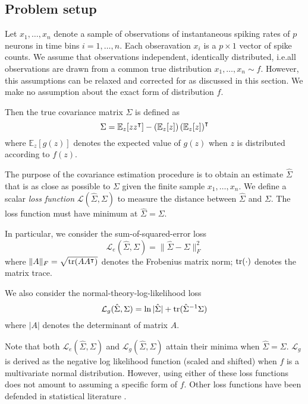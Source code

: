 \subsection{Problem setup}
Let $x_1,\ldots,x_n$ denote a sample of observations of instantaneous spiking rates of $p$ neurons in time bins $i=1,\ldots,n$.  Each obseravation $x_i$ is a $p\times 1$ vector of spike counts.  We assume that observations independent, identically distributed, i.e.\;all observations are drawn from a common true distribution $x_1,\ldots,x_n \sim f$.  However, this assumptions can be relaxed and corrected for as discussed in this section. We make no assumption about the exact form of distribution $f$. 

Then the true  covariance matrix $\Sigma$ is defined as
\begin{equation}
\Sigma =\mathbb E_z[ zz^\intercal] - \left(\mathbb E_z[z]\right)\left(\mathbb E_z[z]\right)^\intercal
\end{equation}
where $\mathbb E_z[g(z)]$ denotes the expected value of $g(z)$ when $z$ is distributed according to $f(z)$. 

The purpose of the covariance estimation procedure is to obtain an estimate $\hat \Sigma$ that is as close as possible to $\Sigma$ given the finite sample  $x_1,\ldots,x_n$. We define a scalar \emph{loss function} $\mathcal L\left(\hat \Sigma, \Sigma\right)$ to measure the distance between $\hat \Sigma$ and $\Sigma$.  The loss function must have minimum at $\hat \Sigma=\Sigma$. 

In particular, we consider the sum-of-squared-error loss
\begin{equation}
\mathcal L_e(\hat \Sigma, \Sigma) =  \| \hat \Sigma - \Sigma\|^2_F 
\end{equation}
where $\| A \|_F = \sqrt{\operatorname{tr}(AA^\intercal)}$ denotes the Frobenius matrix norm; $\operatorname{tr}(\cdot)$ denotes the matrix trace.

We also consider the normal-theory-log-likelihood loss
\begin{equation}
\mathcal L_g(\hat \Sigma,\Sigma) = \ln |\hat \Sigma|  + \operatorname{tr}(\hat \Sigma^{-1}\Sigma)
\end{equation}
where $|A|$ denotes the determinant of matrix $A$.

Note that both $\mathcal L_e(\hat\Sigma,\Sigma)$ and $\mathcal L_g(\hat\Sigma,\Sigma)$ attain their minima when $\hat\Sigma = \Sigma$.   $\mathcal L_g$ is derived as the negative log likelihood function (scaled and shifted) when $f$ is a multivariate normal distribution.  However, using either of these loss functions does not amount to assuming a specific form of $f$. Other loss functions have been defended in statistical literature \citep{James:1961,Fan:2008}.  



